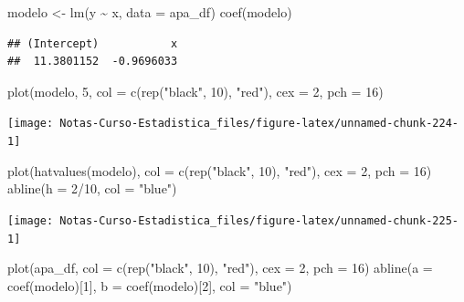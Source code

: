 \documentclass[
  12pt,
]{book}
\newenvironment{Shaded}{\begin{snugshade}}{\end{snugshade}}
\newcommand{\AttributeTok}[1]{\textcolor[rgb]{0.77,0.63,0.00}{#1}}
\newcommand{\DecValTok}[1]{\textcolor[rgb]{0.00,0.00,0.81}{#1}}
\newcommand{\FunctionTok}[1]{\textcolor[rgb]{0.00,0.00,0.00}{#1}}
\newcommand{\NormalTok}[1]{#1}
\newcommand{\OtherTok}[1]{\textcolor[rgb]{0.56,0.35,0.01}{#1}}
\newcommand{\SpecialCharTok}[1]{\textcolor[rgb]{0.00,0.00,0.00}{#1}}
\newcommand{\StringTok}[1]{\textcolor[rgb]{0.31,0.60,0.02}{#1}}
\theoremstyle{definition}
\theoremstyle{definition}
\theoremstyle{definition}
\theoremstyle{remark}
\begin{document}
\begin{Shaded}
\begin{Highlighting}[]
\NormalTok{modelo }\OtherTok{\textless{}{-}} \FunctionTok{lm}\NormalTok{(y }\SpecialCharTok{\textasciitilde{}}\NormalTok{ x, }\AttributeTok{data =}\NormalTok{ apa\_df)}
\FunctionTok{coef}\NormalTok{(modelo)}
\end{Highlighting}
\end{Shaded}

\begin{verbatim}
## (Intercept)           x 
##  11.3801152  -0.9696033
\end{verbatim}

\begin{Shaded}
\begin{Highlighting}[]
\FunctionTok{plot}\NormalTok{(modelo, }\DecValTok{5}\NormalTok{, }\AttributeTok{col =} \FunctionTok{c}\NormalTok{(}\FunctionTok{rep}\NormalTok{(}\StringTok{"black"}\NormalTok{, }\DecValTok{10}\NormalTok{), }\StringTok{"red"}\NormalTok{), }\AttributeTok{cex =} \DecValTok{2}\NormalTok{, }
    \AttributeTok{pch =} \DecValTok{16}\NormalTok{)}
\end{Highlighting}
\end{Shaded}

\begin{center}\texttt{[image: Notas-Curso-Estadistica\_files/figure-latex/unnamed-chunk-224-1]} \end{center}

\begin{Shaded}
\begin{Highlighting}[]
\FunctionTok{plot}\NormalTok{(}\FunctionTok{hatvalues}\NormalTok{(modelo), }\AttributeTok{col =} \FunctionTok{c}\NormalTok{(}\FunctionTok{rep}\NormalTok{(}\StringTok{"black"}\NormalTok{, }\DecValTok{10}\NormalTok{), }\StringTok{"red"}\NormalTok{), }
    \AttributeTok{cex =} \DecValTok{2}\NormalTok{, }\AttributeTok{pch =} \DecValTok{16}\NormalTok{)}
\FunctionTok{abline}\NormalTok{(}\AttributeTok{h =} \DecValTok{2}\SpecialCharTok{/}\DecValTok{10}\NormalTok{, }\AttributeTok{col =} \StringTok{"blue"}\NormalTok{)}
\end{Highlighting}
\end{Shaded}

\begin{center}\texttt{[image: Notas-Curso-Estadistica\_files/figure-latex/unnamed-chunk-225-1]} \end{center}

\begin{Shaded}
\begin{Highlighting}[]
\FunctionTok{plot}\NormalTok{(apa\_df, }\AttributeTok{col =} \FunctionTok{c}\NormalTok{(}\FunctionTok{rep}\NormalTok{(}\StringTok{"black"}\NormalTok{, }\DecValTok{10}\NormalTok{), }\StringTok{"red"}\NormalTok{), }\AttributeTok{cex =} \DecValTok{2}\NormalTok{, }
    \AttributeTok{pch =} \DecValTok{16}\NormalTok{)}
\FunctionTok{abline}\NormalTok{(}\AttributeTok{a =} \FunctionTok{coef}\NormalTok{(modelo)[}\DecValTok{1}\NormalTok{], }\AttributeTok{b =} \FunctionTok{coef}\NormalTok{(modelo)[}\DecValTok{2}\NormalTok{], }\AttributeTok{col =} \StringTok{"blue"}\NormalTok{)}
\end{Highlighting}
\end{Shaded}
\end{document}
